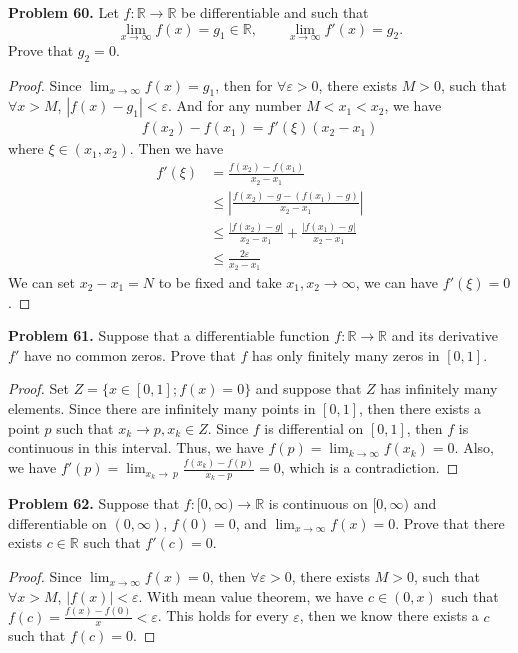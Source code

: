 \documentclass[12pt,leqno]{amsart}
\begin{document}
\noindent
{\bf Problem 60.}
Let $f:\mathbb{R}\to\mathbb{R}$ be differentiable and such that
$$
\lim_{x\to \infty} f(x)=g_1\in\mathbb{R},
\qquad
\lim_{x\to\infty} f'(x) = g_2.
$$
Prove that $g_2=0$.
\begin{proof}
Since $\lim_{x\to \infty} f(x)=g_1$, then for $\forall \varepsilon >0$, there exists $M>0$, such that $\forall x>M$, $|f(x)-g_1|<\varepsilon$. And for any number $M<x_1<x_2$, we have
\begin{align*}
    f(x_2)-f(x_1) = f'(\xi)(x_2-x_1)
\end{align*}
where $\xi\in(x_1,x_2)$. Then we have 
\begin{align*}
    f'(\xi) &=\frac{f(x_2)-f(x_1)}{x_2-x_1} \\
    & \leq \left|\frac{f(x_2)-g-(f(x_1)-g)}{x_2-x_1}  \right| \\
    & \leq \frac{\left|f(x_2)-g\right|}{x_2-x_1} + \frac{\left|f(x_1)-g\right|}{x_2-x_1} \\
    & \leq \frac{2\varepsilon}{x_2-x_1}
\end{align*}
We can set $x_2-x_1=N$ to be fixed and take $x_1,x_2\rightarrow \infty$, we can have $f'(\xi)=0$.
\end{proof}

\medskip


\noindent
{\bf Problem 61.}
Suppose that a differentiable function $f:\mathbb{R}\to\mathbb{R}$ and its derivative $f'$ have no common zeros. Prove that $f$ has only finitely many zeros in $[0,1]$.
\begin{proof}
Set $Z=\{x\in[0,1];f(x)=0\}$ and suppose that $Z$ has infinitely many elements. Since there are infinitely many points in $[0,1]$, then there exists a point $p$ such that $x_k\rightarrow p, x_k\in Z$. Since $f$ is differential on $[0,1]$, then $f$ is continuous in this interval. Thus, we have $f(p)=\lim_{k\to\infty}f(x_k)=0$. Also, we have $f'(p)=\lim_{x_k\to\ p}\frac{f(x_k)-f(p)}{x_k-p}=0$, which is a contradiction.
\end{proof}

\medskip


\noindent
{\bf Problem 62.}
Suppose that $f:[0,\infty)\to\mathbb{R}$ is continuous on $[0,\infty)$ and differentiable on $(0,\infty)$, $f(0)=0$, and $\displaystyle\lim_{x\to\infty} f(x)=0$. Prove that there exists $c\in\mathbb{R}$ such that $f'(c)=0$.
\begin{proof}
Since $\lim_{x\to\infty}f(x)=0$, then $\forall \varepsilon>0$, there exists $M>0$, such that $\forall x>M$, $|f(x)|<\varepsilon$. With mean value theorem, we have $c\in(0,x)$ such that $f(c)=\frac{f(x)-f(0)}{x}<\varepsilon$. This holds for every $\varepsilon$, then we know there exists a $c$ such that $f(c)=0$.
\end{proof}
\end{document}
